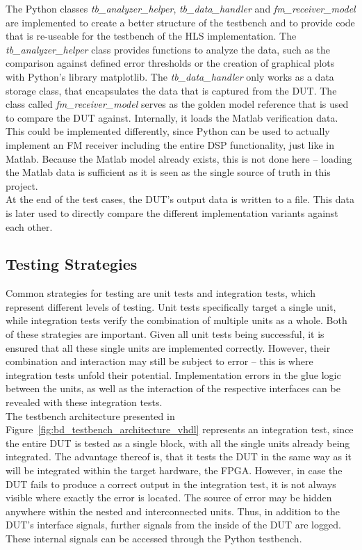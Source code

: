 The Python classes \textit{tb\_analyzer\_helper}, \textit{tb\_data\_handler} and \textit{fm\_receiver\_model} are implemented to create a better structure of the testbench and to provide code that is re-useable for the testbench of the HLS implementation.
The \textit{tb\_analyzer\_helper} class provides functions to analyze the data, such as the comparison against defined error thresholds or the creation of graphical plots with Python's library matplotlib.
The \textit{tb\_data\_handler} only works as a data storage class, that encapsulates the data that is captured from the DUT.
The class called \textit{fm\_receiver\_model} serves as the golden model reference that is used to compare the DUT against.
Internally, it loads the Matlab verification data.
This could be implemented differently, since Python can be used to actually implement an FM receiver including the entire DSP functionality, just like in Matlab.
Because the Matlab model already exists, this is not done here -- loading the Matlab data is sufficient as it is seen as the single source of truth in this project.\\

At the end of the test cases, the DUT's output data is written to a file.
This data is later used to directly compare the different implementation variants against each other.

\subsection{Testing Strategies}

Common strategies for testing are unit tests and integration tests, which represent different levels of testing.
Unit tests specifically target a single unit, while integration tests verify the combination of multiple units as a whole.
Both of these strategies are important.
Given all unit tests being successful, it is ensured that all these single units are implemented correctly.
However, their combination and interaction may still be subject to error -- this is where integration tests unfold their potential.
Implementation errors in the glue logic between the units, as well as the interaction of the respective interfaces can be revealed with these integration tests.\\

The testbench architecture presented in Figure~\ref{fig:bd_testbench_architecture_vhdl} represents an integration test, since the entire DUT is tested as a single block, with all the single units already being integrated.
The advantage thereof is, that it tests the DUT in the same way as it will be integrated within the target hardware, the FPGA.
However, in case the DUT fails to produce a correct output in the integration test, it is not always visible where exactly the error is located.
The source of error may be hidden anywhere within the nested and interconnected units.
Thus, in addition to the DUT's interface signals, further signals from the inside of the DUT are logged.
These internal signals can be accessed through the Python testbench.\\

